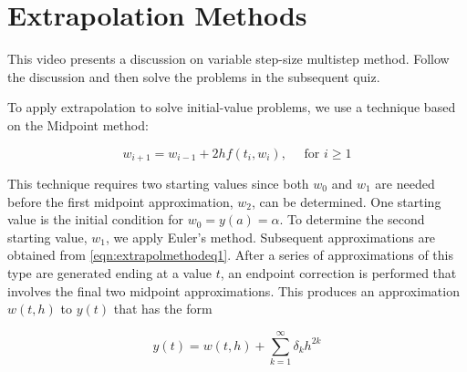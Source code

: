 \section{Extrapolation Methods}


\videolesson
\begin{selfvideo}[1]
This video presents a discussion on variable step-size multistep method. Follow the discussion and then solve the problems in the subsequent quiz.
\end{selfvideo}

To apply extrapolation to solve initial-value problems, we use a technique based on the Midpoint method:


\begin{equation}\label{eqn:extrapolmethodeq1}
w_{i+1}=w_{i-1}+2 h f\left(t_{i}, w_{i}\right), \quad \text { for } i \geq 1
\end{equation}

This technique requires two starting values since both $w_{0}$ and $w_{1}$ are needed before the first midpoint approximation, $w_{2}$, can be determined. One starting value is the initial condition for $w_{0}=y(a)=\alpha$. To determine the second starting value, $w_{1}$, we apply Euler's method. Subsequent approximations are obtained from \ref{eqn:extrapolmethodeq1}. After a series of approximations of this type are generated ending at a value $t$, an endpoint correction is performed that involves the final two midpoint approximations. This produces an approximation $w(t, h)$ to $y(t)$ that has the form


\begin{equation}\label{eqn:extrapolmethodeq2}
y(t)=w(t, h)+\sum_{k=1}^{\infty} \delta_{k} h^{2 k}
\end{equation}

